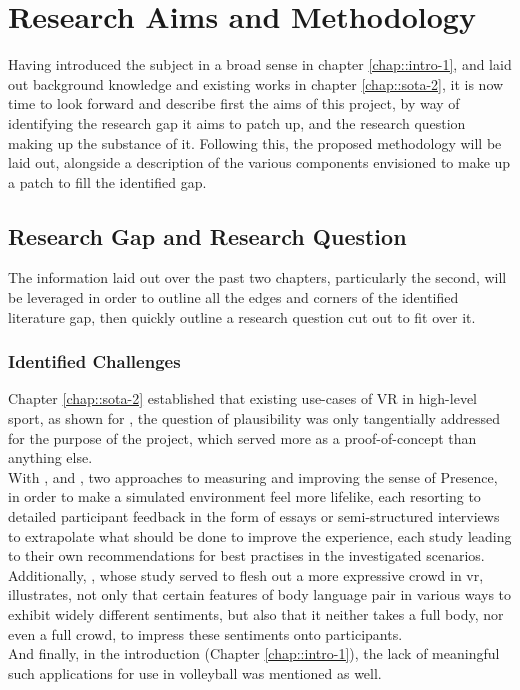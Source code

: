\chapter{Research Aims and Methodology}
\label{chap::design-3}

Having introduced the subject in a broad sense in chapter \ref{chap::intro-1}, and laid out background knowledge and existing works in chapter \ref{chap::sota-2}, it is now time to look forward and describe first the aims of this project, by way of identifying the research gap it aims to patch up, and the research question making up the substance of it. Following this, the proposed methodology will be laid out, alongside a description of the various components envisioned to make up a patch to fill the identified gap.

\section{Research Gap and Research Question}
\label{sec:ProblemFormulation}

The information laid out over the past two chapters, particularly the second, will be leveraged in order to outline all the edges and corners of the identified literature gap, then quickly outline a research question cut out to fit over it.

\subsection{Identified Challenges}
\label{sec::challenges}

Chapter \ref{chap::sota-2} established that existing use-cases of VR in high-level sport, as shown for \cite{stinson-2014-feasibility}, the question of plausibility was only tangentially addressed for the purpose of the project, which served more as a proof-of-concept than anything else.\\
With \cite{slater-2023-sentiment}, and \cite{riches-2019-factors}, two approaches to measuring and improving the sense of Presence, in order to make a simulated environment feel more lifelike, each resorting to detailed participant feedback in the form of essays or semi-structured interviews to extrapolate what should be done to improve the experience, each study leading to their own recommendations for best practises in the investigated scenarios.\\
Additionally, \cite{glemarec-2021-indifferent}, whose study served to flesh out a more expressive crowd in \gls{vr}, illustrates, not only that certain features of body language pair in various ways to exhibit widely different sentiments, but also that it neither takes a full body, nor even a full crowd, to impress these sentiments onto participants.\\
And finally, in the introduction (Chapter \ref{chap::intro-1}), the lack of meaningful such applications for use in volleyball was mentioned as well.\\

